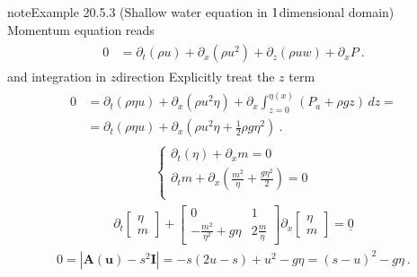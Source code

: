\documentclass[letterpaper,10pt,english]{jupyterBook}
\begin{document}
\begin{sphinxadmonition}{note}{Example 20.5.3 (Shallow water equation in \protect\(1\protect\)\sphinxhyphen{}dimensional domain)}
\sphinxAtStartPar
Momentum equation reads
\begin{equation*}
\begin{split}\begin{aligned}
  0
  & = \partial_t (\rho u) + \partial_x (\rho u^2) + \partial_z (\rho u w) + \partial_x P \ .
\end{aligned}\end{split}
\end{equation*}
\sphinxAtStartPar
and integration in \(z\)\sphinxhyphen{}direction  Explicitly treat the \(z\) term
\begin{equation*}
\begin{split}\begin{aligned}
  0
  & = \partial_t (\rho \eta u) + \partial_x (\rho u^2 \eta) + \partial_x \int_{z=0}^{\eta(x)} (P_a + \rho g z) \, dz = \\
  & = \partial_t (\rho \eta u) + \partial_x \left(\rho u^2 \eta + \frac{1}{2} \rho g \eta^2 \right)  \ .
\end{aligned}\end{split}
\end{equation*}
\sphinxAtStartPar
{}
\begin{equation*}
\begin{split}\begin{cases}
  \partial_t (\eta) + \partial_x m = 0 \\
  \partial_t m + \partial_x \left( \frac{m^2}{\eta} + \frac{g \eta^2}{2} \right) = 0 \\
\end{cases}\end{split}
\end{equation*}
\sphinxAtStartPar
{}
\begin{equation*}
\begin{split}
  \partial_t \begin{bmatrix} \eta \\ m \end{bmatrix} + \begin{bmatrix} 0 & 1 \\ -\frac{m^2}{\eta^2}+g\eta & 2 \frac{m}{\eta} \end{bmatrix} \partial_x \begin{bmatrix} \eta \\ m \end{bmatrix} = \underline{0}
\end{split}
\end{equation*}
\sphinxAtStartPar
{}
\begin{equation*}
\begin{split}0 = |\mathbf{A}(\mathbf{u}) - s^2 \mathbf{I}| = -s \left( 2 u - s \right) + u^2 - g \eta = (s-u)^2 - g  \eta \ .\end{split}
\end{equation*}\end{sphinxadmonition}
\end{document}
